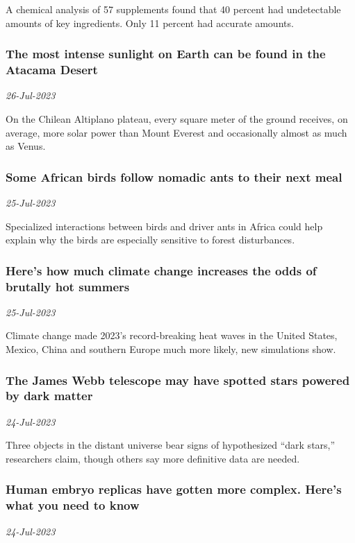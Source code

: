 A chemical analysis of 57 supplements found that 40 percent had undetectable amounts of key ingredients. Only 11 percent had accurate amounts.
\subsubsection{The most intense sunlight on Earth can be found in the Atacama Desert \href{https://www.sciencenews.org/article/most-intense-sunlight-earth-atacama-desert}{}}
\textit{26-Jul-2023}

On the Chilean Altiplano plateau, every square meter of the ground receives, on average, more solar power than Mount Everest and occasionally almost as much as Venus.
\subsubsection{Some African birds follow nomadic ants to their next meal \href{https://www.sciencenews.org/article/birds-driver-ants-africa-ecology}{}}
\textit{25-Jul-2023}

Specialized interactions between birds and driver ants in Africa could help explain why the birds are especially sensitive to forest disturbances.
\subsubsection{Here’s how much climate change increases the odds of brutally hot summers \href{https://www.sciencenews.org/article/climate-change-heat-wave-summer}{}}
\textit{25-Jul-2023}

Climate change made 2023’s record-breaking heat waves in the United States, Mexico, China and southern Europe much more likely, new simulations show.
\subsubsection{The James Webb telescope may have spotted stars powered by dark matter \href{https://www.sciencenews.org/article/james-webb-telescope-stars-dark-matter}{}}
\textit{24-Jul-2023}

Three objects in the distant universe bear signs of hypothesized “dark stars,” researchers claim, though others say more definitive data are needed.
\subsubsection{Human embryo replicas have gotten more complex. Here’s what you need to know \href{https://www.sciencenews.org/article/human-embryo-replica-complex-advanced}{}}
\textit{24-Jul-2023}

